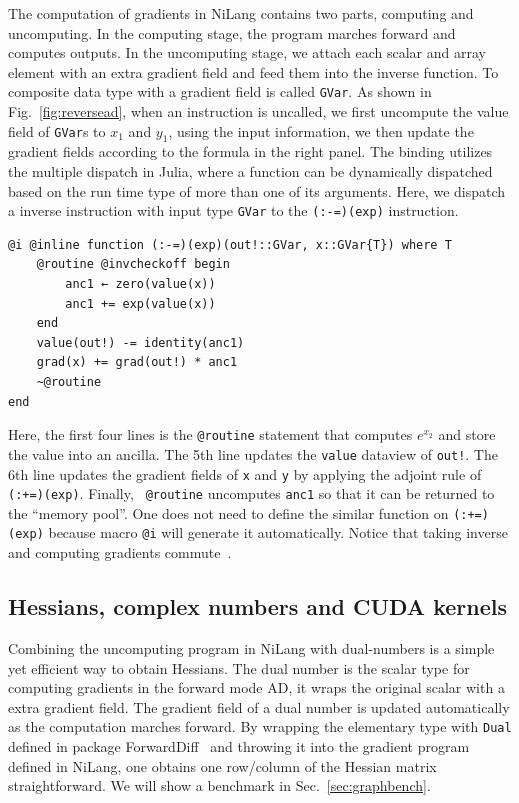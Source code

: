 \documentclass{article}
\newcommand{\<}{\langle}
\renewcommand{\>}{\rangle}
\newcommand{\Fig}[1]{Fig.~\ref{#1}}
\newcommand{\Sec}[1]{Sec.~\ref{#1}}
\theoremstyle{definition}\newtheorem{definition}{\textit{Definition}}
\begin{document}
The computation of gradients in NiLang contains two parts, computing and uncomputing. In the computing stage, the program marches forward and computes outputs.
In the uncomputing stage, we attach each scalar and array element with an extra gradient field and feed them into the inverse function. To composite data type with a gradient field is called \texttt{GVar}. As shown in \Fig{fig:reversead}, when an instruction is uncalled, we first uncompute the value field of \texttt{GVar}s to $x_1$ and $y_1$, using the input information, we then update the gradient fields according to the formula in the right panel. The binding utilizes the multiple dispatch in Julia, where a function can be dynamically dispatched based on the run time type of more than one of its arguments. Here, we dispatch a inverse instruction with input type \texttt{GVar} to the \texttt{(:-=)(exp)} instruction.

\begin{minipage}{.88\columnwidth}
\begin{lstlisting}[mathescape=true]
@i @inline function (:-=)(exp)(out!::GVar, x::GVar{T}) where T
    @routine @invcheckoff begin
        anc1 ← zero(value(x))
        anc1 += exp(value(x))
    end
    value(out!) -= identity(anc1)
    grad(x) += grad(out!) * anc1
    ~@routine
end
\end{lstlisting}
\end{minipage}

Here, the first four lines is the \texttt{@routine} statement that computes $e^{x_2}$ and store the value into an ancilla. The 5th line updates the \texttt{value} dataview of \texttt{out!}. The 6th line updates the gradient fields of \texttt{x} and \texttt{y} by applying the adjoint rule of \texttt{(:+=)(exp)}. Finally, \texttt{~@routine} uncomputes \texttt{anc1} so that it can be returned to the ``memory pool''.
One does not need to define the similar function on \texttt{(:+=)(exp)} because macro \texttt{@i} will generate it automatically. Notice that taking inverse and computing gradients commute~\cite{Mcinerney2015}.

\subsection{Hessians, complex numbers and CUDA kernels}
Combining the uncomputing program in NiLang with dual-numbers is a simple yet efficient way to obtain Hessians.
The dual number is the scalar type for computing gradients in the forward mode AD, it wraps the original scalar with a extra gradient field. The gradient field of a dual number is updated automatically as the computation marches forward.
By wrapping the elementary type with \texttt{Dual} defined in package ForwardDiff~\cite{Revels2016} and throwing it into the gradient program defined in NiLang,
one obtains one row/column of the Hessian matrix straightforward.
We will show a benchmark in \Sec{sec:graphbench}.
\end{document}
